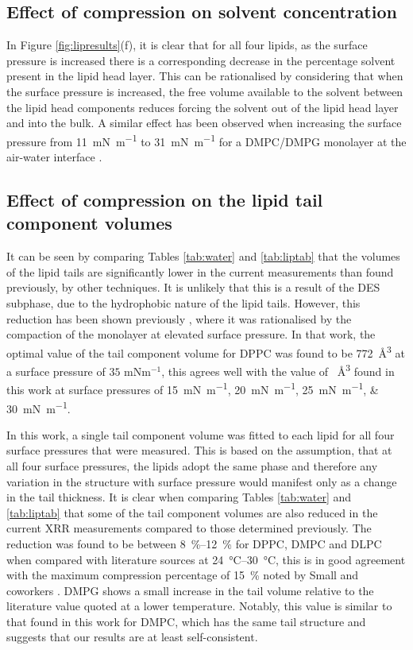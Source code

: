 \documentclass[amsmath,amssymb,twocolumn,superscriptaddress]{revtex4-1}
\begin{document}
\subsection{Effect of compression on solvent concentration}
%
In Figure \ref{fig:lipresults}(f), it is clear that for all four lipids, as the surface pressure is increased there is a corresponding decrease in the percentage solvent present in the lipid head layer.
This can be rationalised by considering that when the surface pressure is increased, the free volume available to the solvent between the lipid head components reduces forcing the solvent out of the lipid head layer and into the bulk.
A similar effect has been observed when increasing the surface pressure from \SI{11}{\milli\newton\per\meter} to \SI{31}{\milli\newton\per\meter} for a DMPC/DMPG monolayer at the air-water interface \cite{bayerl_specular_1990}.

\subsection{Effect of compression on the lipid tail component volumes}
%
It can be seen by comparing Tables \ref{tab:water} and \ref{tab:liptab} that the volumes of the lipid tails are significantly lower in the current measurements than found previously, by other techniques.
It is unlikely that this is a result of the DES subphase, due to the hydrophobic nature of the lipid tails.
However, this reduction has been shown previously \cite{campbell_structure_2018}, where it was rationalised by the compaction of the monolayer at elevated surface pressure.
In that work, the optimal value of the tail component volume for DPPC was found to be \SI{772}{\angstrom\cubed} at a surface pressure of $35$ mNm$^{-1}$, this agrees well with the value of ~\si{\angstrom\cubed} found in this work at surface pressures of \SIlist[list-units = single]{15;20;25;30}{\milli\newton\per\meter}.

In this work, a single tail component volume was fitted to each lipid for all four surface pressures that were measured.
This is based on the assumption, that at all four surface pressures, the lipids adopt the same phase and therefore any variation in the structure with surface pressure would manifest only as a change in the tail thickness.
It is clear when comparing Tables \ref{tab:water} and \ref{tab:liptab} that some of the tail component volumes are also reduced in the current XRR measurements compared to those determined previously.
The reduction was found to be between \SIrange{8}{12}{\percent} for DPPC, DMPC and DLPC when compared with literature sources at \SIrange{24}{30}{\celsius}, this is in good agreement with the maximum compression percentage of \SI{15}{\percent} noted by Small and coworkers \cite{small_lateral_1984}.
DMPG shows a small increase in the tail volume relative to the literature value quoted at a lower temperature.
Notably, this value is similar to that found in this work for DMPC, which has the same tail structure and suggests that our results are at least self-consistent.
\end{document}
